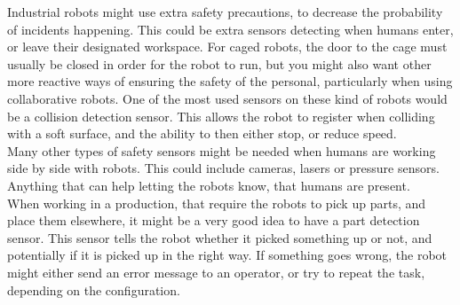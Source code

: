 Industrial robots might use extra safety precautions, to decrease the probability of incidents happening. This could be extra sensors detecting when humans enter, or leave their designated workspace. For caged robots, the door to the cage must usually be closed in order for the robot to run, but you might also want other more reactive ways of ensuring the safety of the personal, particularly when using collaborative robots. One of the most used sensors on these kind of robots would be a collision detection sensor. This allows the robot to register when colliding with a soft surface, and the ability to then either stop, or reduce speed.\\ 

Many other types of safety sensors might be needed when humans are working side by side with robots. This could include cameras, lasers or pressure sensors. Anything that can help letting the robots know, that humans are present.\\ 

When working in a production, that require the robots to pick up parts, and place them elsewhere, it might be a very good idea to have a part detection sensor. This sensor tells the robot whether it picked something up or not, and potentially if it is picked up in the right way. If something goes wrong, the robot might either send an error message to an operator, or try to repeat the task, depending on the configuration.\\
\cite{sensors}